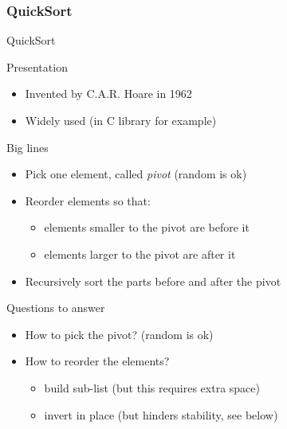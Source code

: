\subsubsection{QuickSort}
\begin{frame}{QuickSort}

  \begin{block}{Presentation}
    \begin{itemize}
    \item Invented by C.A.R. Hoare in 1962
    \item Widely used (in C library for example)
    \end{itemize}
  \end{block}

  \begin{block}{Big lines}
    \begin{itemize}
    \item Pick one element, called \alert{\textit{pivot}}
      (random is ok)
    \item Reorder elements so that:
      \begin{minipage}{.55\linewidth}
        \begin{itemize}
        \item elements smaller to the pivot are before it%
          \vspace{-.4\baselineskip}
        \item elements larger to the pivot are after it
        \end{itemize}
      \end{minipage}
    \item Recursively sort the parts before and after the pivot
    \end{itemize}
  \end{block}

  \begin{block}{Questions to answer}
    \begin{itemize}
    \item How to pick the pivot? (random is ok)
    \item How to reorder the elements?
      \begin{itemize}
      \item {} build sub-list (but this requires extra
        space)
      \item {} invert in place (but hinders stability,
        see below)
      \end{itemize}
    \end{itemize}
  \end{block}
\end{frame}
